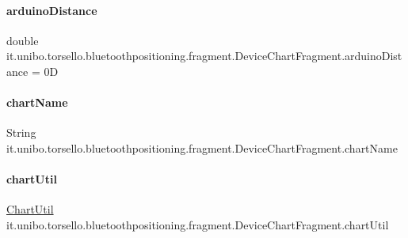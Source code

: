 \paragraph{\texorpdfstring{arduino\+Distance}{arduinoDistance}}
{\footnotesize\ttfamily double it.\+unibo.\+torsello.\+bluetoothpositioning.\+fragment.\+Device\+Chart\+Fragment.\+arduino\+Distance = 0D\hspace{0.3cm}{\ttfamily [private]}}

\hypertarget{classit_1_1unibo_1_1torsello_1_1bluetoothpositioning_1_1fragment_1_1DeviceChartFragment_a3ad9d4a2c35dc877d54b82168620c449_a3ad9d4a2c35dc877d54b82168620c449}{}\label{classit_1_1unibo_1_1torsello_1_1bluetoothpositioning_1_1fragment_1_1DeviceChartFragment_a3ad9d4a2c35dc877d54b82168620c449_a3ad9d4a2c35dc877d54b82168620c449} 
\paragraph{\texorpdfstring{chart\+Name}{chartName}}
{\footnotesize\ttfamily String it.\+unibo.\+torsello.\+bluetoothpositioning.\+fragment.\+Device\+Chart\+Fragment.\+chart\+Name\hspace{0.3cm}{\ttfamily [private]}}

\hypertarget{classit_1_1unibo_1_1torsello_1_1bluetoothpositioning_1_1fragment_1_1DeviceChartFragment_ad28ad16d89e075ea2e572bba9b24bc4e_ad28ad16d89e075ea2e572bba9b24bc4e}{}\label{classit_1_1unibo_1_1torsello_1_1bluetoothpositioning_1_1fragment_1_1DeviceChartFragment_ad28ad16d89e075ea2e572bba9b24bc4e_ad28ad16d89e075ea2e572bba9b24bc4e} 
\paragraph{\texorpdfstring{chart\+Util}{chartUtil}}
{\footnotesize\ttfamily \hyperlink{classit_1_1unibo_1_1torsello_1_1bluetoothpositioning_1_1util_1_1ChartUtil}{Chart\+Util} it.\+unibo.\+torsello.\+bluetoothpositioning.\+fragment.\+Device\+Chart\+Fragment.\+chart\+Util\hspace{0.3cm}{\ttfamily [private]}}

